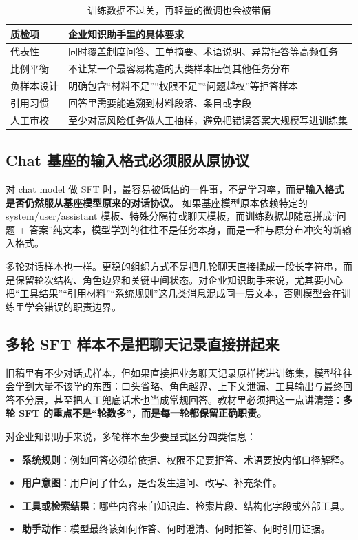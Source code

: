 \begin{table}[H]
\centering
\small
\begin{tabularx}{\textwidth}{>{\raggedright\arraybackslash}p{2.8cm}>{\raggedright\arraybackslash}X}
\toprule
\textbf{质检项} & \textbf{企业知识助手里的具体要求} \\
\midrule
代表性 & 同时覆盖制度问答、工单摘要、术语说明、异常拒答等高频任务 \\
比例平衡 & 不让某一个最容易构造的大类样本压倒其他任务分布 \\
负样本设计 & 明确包含“材料不足”“权限不足”“问题越权”等拒答样本 \\
引用习惯 & 回答里需要能追溯到材料段落、条目或字段 \\
人工审校 & 至少对高风险任务做人工抽样，避免把错误答案大规模写进训练集 \\
\bottomrule
\end{tabularx}
\caption{训练数据不过关，再轻量的微调也会被带偏}
\label{tab:finetune-data-qc}
\end{table}

\subsection{Chat 基座的输入格式必须服从原协议}
对 chat model 做 SFT 时，最容易被低估的一件事，不是学习率，而是\textbf{输入格式是否仍然服从基座模型原来的对话协议。} 如果基座模型原本依赖特定的 system/user/assistant 模板、特殊分隔符或聊天模板，而训练数据却随意拼成“问题 + 答案”纯文本，模型学到的往往不是任务本身，而是一种与原分布冲突的新输入格式。

多轮对话样本也一样。更稳的组织方式不是把几轮聊天直接揉成一段长字符串，而是保留轮次结构、角色边界和关键中间状态。对企业知识助手来说，尤其要小心把“工具结果”“引用材料”“系统规则”这几类消息混成同一层文本，否则模型会在训练里学会错误的职责边界。

\subsection{多轮 SFT 样本不是把聊天记录直接拼起来}
旧稿里有不少对话式样本，但如果直接把业务聊天记录原样拷进训练集，模型往往会学到大量不该学的东西：口头省略、角色越界、上下文泄漏、工具输出与最终回答不分层，甚至把人工兜底话术也当成常规回答。教材里必须把这一点讲清楚：\textbf{多轮 SFT 的重点不是“轮数多”，而是每一轮都保留正确职责。}

对企业知识助手来说，多轮样本至少要显式区分四类信息：
\begin{itemize}
  \item \textbf{系统规则}：例如回答必须给依据、权限不足要拒答、术语要按内部口径解释。
  \item \textbf{用户意图}：用户问了什么，是否发生追问、改写、补充条件。
  \item \textbf{工具或检索结果}：哪些内容来自知识库、检索片段、结构化字段或外部工具。
  \item \textbf{助手动作}：模型最终该如何作答、何时澄清、何时拒答、何时引用证据。
\end{itemize}

